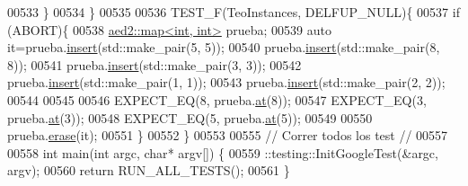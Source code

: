 \begin{DoxyCode}
00533     \}
00534 \}
00535 
00536 TEST\_F(TeoInstances, DELFUP\_NULL)\{
00537     \textcolor{keywordflow}{if} (ABORT)\{
00538         \hyperlink{classaed2_1_1map}{aed2::map<int, int>} prueba;
00539         \textcolor{keyword}{auto} it=prueba.\hyperlink{classaed2_1_1map_a6941cde9a79c27f054b5c97a587a1854_a6941cde9a79c27f054b5c97a587a1854}{insert}(std::make\_pair(5, 5));
00540         prueba.\hyperlink{classaed2_1_1map_a6941cde9a79c27f054b5c97a587a1854_a6941cde9a79c27f054b5c97a587a1854}{insert}(std::make\_pair(8, 8));
00541         prueba.\hyperlink{classaed2_1_1map_a6941cde9a79c27f054b5c97a587a1854_a6941cde9a79c27f054b5c97a587a1854}{insert}(std::make\_pair(3, 3));
00542         prueba.\hyperlink{classaed2_1_1map_a6941cde9a79c27f054b5c97a587a1854_a6941cde9a79c27f054b5c97a587a1854}{insert}(std::make\_pair(1, 1));
00543         prueba.\hyperlink{classaed2_1_1map_a6941cde9a79c27f054b5c97a587a1854_a6941cde9a79c27f054b5c97a587a1854}{insert}(std::make\_pair(2, 2));
00544 
00545 
00546         EXPECT\_EQ(8, prueba.\hyperlink{classaed2_1_1map_a0b0a11f906da2926f9eb342fcee79fd7_a0b0a11f906da2926f9eb342fcee79fd7}{at}(8));
00547         EXPECT\_EQ(3, prueba.\hyperlink{classaed2_1_1map_a0b0a11f906da2926f9eb342fcee79fd7_a0b0a11f906da2926f9eb342fcee79fd7}{at}(3));
00548         EXPECT\_EQ(5, prueba.\hyperlink{classaed2_1_1map_a0b0a11f906da2926f9eb342fcee79fd7_a0b0a11f906da2926f9eb342fcee79fd7}{at}(5));
00549 
00550         prueba.\hyperlink{classaed2_1_1map_ad8e796bf9c9c558e5ce6b61e116253fe_ad8e796bf9c9c558e5ce6b61e116253fe}{erase}(it);
00551     \}
00552 \}
00553 
00555 \textcolor{comment}{// Correr todos los test //}
00557 \textcolor{comment}{}
00558 \textcolor{keywordtype}{int} main(\textcolor{keywordtype}{int} argc, \textcolor{keywordtype}{char}* argv[]) \{
00559     ::testing::InitGoogleTest(&argc, argv);
00560   \textcolor{keywordflow}{return} RUN\_ALL\_TESTS();
00561 \}
\end{DoxyCode}
